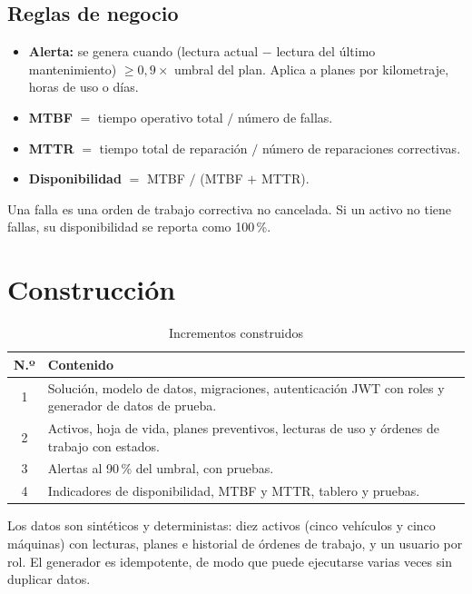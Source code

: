 \documentclass[12pt,letterpaper]{article}
\begin{document}
\subsection{Reglas de negocio}

\begin{itemize}
  \item \textbf{Alerta:} se genera cuando (lectura actual $-$ lectura del último mantenimiento) $\geq 0{,}9 \times$ umbral del plan. Aplica a planes por kilometraje, horas de uso o días.
  \item \textbf{MTBF} $=$ tiempo operativo total $/$ número de fallas.
  \item \textbf{MTTR} $=$ tiempo total de reparación $/$ número de reparaciones correctivas.
  \item \textbf{Disponibilidad} $=$ MTBF $/$ (MTBF $+$ MTTR).
\end{itemize}

Una falla es una orden de trabajo correctiva no cancelada. Si un activo no tiene fallas, su disponibilidad se reporta como 100\,\%.

\section{Construcción}

\begin{table}[H]
  \centering
  \caption{Incrementos construidos}\label{tab:incrementos}
  \begin{tabularx}{\textwidth}{@{}cX@{}}
    \toprule
    N.º & Contenido \\
    \midrule
    1 & Solución, modelo de datos, migraciones, autenticación JWT con roles y generador de datos de prueba. \\
    2 & Activos, hoja de vida, planes preventivos, lecturas de uso y órdenes de trabajo con estados. \\
    3 & Alertas al 90\,\% del umbral, con pruebas. \\
    4 & Indicadores de disponibilidad, MTBF y MTTR, tablero y pruebas. \\
    \bottomrule
  \end{tabularx}
\end{table}

Los datos son sintéticos y deterministas: diez activos (cinco vehículos y cinco máquinas) con lecturas, planes e historial de órdenes de trabajo, y un usuario por rol. El generador es idempotente, de modo que puede ejecutarse varias veces sin duplicar datos.
\end{document}
